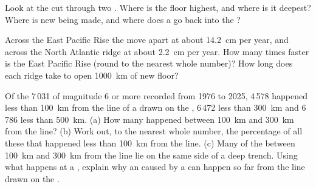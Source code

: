 \begin{exercise}[$\star\star$]\label{exo:g7:plate-tectonics:10}
Look at the cut through two . Where is the  floor
highest, and where is it deepest? Where is new  being made, and where
does a  go back into the ?
\end{exercise}

\begin{exercise}[$\star\star\star$]\label{exo:g7:plate-tectonics:11}
Across the East Pacific Rise the  move apart at about \qty{14.2}{cm}
per year, and across the North Atlantic ridge at about \qty{2.2}{cm} per
year. How many times faster is the East Pacific Rise (round to the nearest
whole number)? How long does each ridge take to open \qty{1000}{km} of new
 floor?
\end{exercise}

\begin{exercise}[$\star\star\star$]\label{exo:g7:plate-tectonics:12}
Of the 7\,031  of magnitude 6 or more recorded from 1976 to
2025, 4\,578 happened less than \qty{100}{km} from the line of a  drawn on the , 6\,472 less than \qty{300}{km} and 6\,786 less
than \qty{500}{km}.
(a) How many happened between \qty{100}{km} and \qty{300}{km} from the
line? (b) Work out, to the nearest whole number, the percentage of all
these  that happened less than \qty{100}{km} from the line.
(c) Many of the  between \qty{100}{km} and \qty{300}{km} from
the line lie on the same side of a deep  trench. Using what happens
at a , explain why an  caused by a  can happen so far from the line drawn on the .
\end{exercise}

